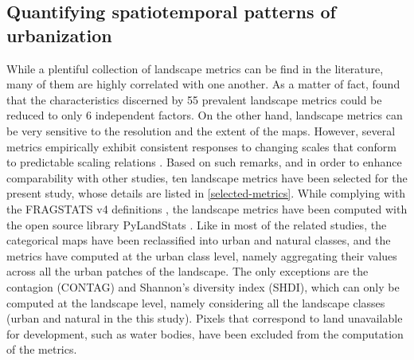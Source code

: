 \subsection*{Quantifying spatiotemporal patterns of urbanization}

While a plentiful collection of landscape metrics can be find in the literature, many of them are highly correlated with one another. As a matter of fact, \cite{riitters1995factor} found that the characteristics discerned by 55 prevalent landscape metrics could be reduced to only 6 independent factors.
On the other hand, landscape metrics can be very sensitive to the resolution and the extent of the maps. However, several metrics empirically exhibit consistent responses to changing scales that conform to predictable scaling relations \citep{wu2002empirical, wu2004effects}.
Based on such remarks, and in order to enhance comparability with other studies, ten landscape metrics have been selected for the present study, whose details are listed in \autoref{selected-metrics}.
While complying with the FRAGSTATS v4 definitions \citep{mcgarigal2012fragstats}, the landscape metrics have been computed with the open source library PyLandStats \citep{bosch2019pylandstats}.
Like in most of the related studies, the categorical maps have been reclassified into urban and natural classes, and the metrics have computed at the urban class level, namely aggregating their values across all the urban patches of the landscape. The only exceptions are the contagion (CONTAG) and Shannon's diversity index (SHDI), which can only be computed at the landscape level, namely considering all the landscape classes (urban and natural in the this study).
Pixels that correspond to land unavailable for development, such as water bodies, have been excluded from the computation of the metrics.

